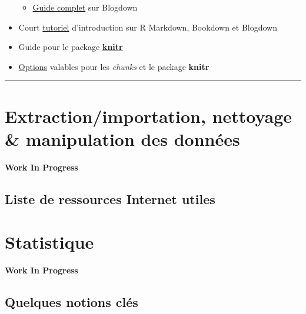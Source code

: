 \documentclass[
]{book}
\providecommand{\tightlist}{%
  \setlength{\itemsep}{0pt}\setlength{\parskip}{0pt}}
\newenvironment{infobox}[1]
  {
  \begin{itemize}
  \renewcommand{\labelitemi}{
    \raisebox{-.7\height}[0pt][0pt]{
      {\setkeys{Gin}{width=3em,keepaspectratio}
        \texttt{[image: images/\#1]}}
    }
  }
  \setlength{\fboxsep}{1em}
  \begin{blackbox}
  \item
  }
  {
  \end{blackbox}
  \end{itemize}
  }
\begin{document}
\begin{itemize}
  \begin{itemize}
  \tightlist
  \item
    \href{https://bookdown.org/yihui/blogdown/}{Guide complet} sur Blogdown
  \end{itemize}
\item
  Court \href{https://slides.yihui.org/2017-rmarkdown-UNL-Yihui-Xie.html\#1}{tutoriel}
  d'introduction sur R Markdown, Bookdown et Blogdown
\item
  Guide pour le package \href{https://yihui.org/knitr/}{\textbf{knitr}}
\item
  \href{https://yihui.org/knitr/options/}{Options} valables pour les \emph{chunks} et le
  package \textbf{knitr}
\end{itemize}

\begin{center}\rule{0.5\linewidth}{0.5pt}\end{center}

\hypertarget{data-analysis}{%
\chapter{Extraction/importation, nettoyage \& manipulation des données}\label{data-analysis}}

\begin{infobox}{caution}

\textbf{Work In Progress}

\end{infobox}

\hypertarget{ref-data-analysis}{%
\section*{Liste de ressources Internet utiles}\label{ref-data-analysis}}

\hypertarget{statistique}{%
\chapter{Statistique}\label{statistique}}

\begin{infobox}{caution}

\textbf{Work In Progress}

\end{infobox}

\hypertarget{quelques-notions-cluxe9s}{%
\section{Quelques notions clés}\label{quelques-notions-cluxe9s}}
\end{document}
